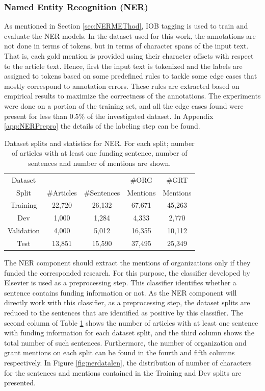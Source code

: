 \documentclass{report}
\theoremstyle{definition}
\theoremstyle{remark}
\begin{document}
\subsubsection{Named Entity Recognition (NER)}
As mentioned in Section \ref{sec:NERMEThod}, IOB tagging is used to train and evaluate the NER models. In the dataset used for this work, the annotations are not done in terms of tokens, but in terms of character spans of the input text. That is, each gold mention is provided using their character offsets with respect to the article text. Hence, first the input text is tokenized and the labels are assigned to tokens based on some predefined rules to tackle some edge cases that mostly correspond to annotation errors. These rules are extracted based on empirical results to maximize the correctness of the annotations. The experiments were done on a portion of the training set, and all the edge cases found were present for less than $0.5\%$ of the investigated dataset. In Appendix \ref{app:NERPrepro} the details of the labeling step can be found.

\begin{table}[h!]
    \centering
    \begin{tabular}{ccccc}
    Dataset &  &  &\#ORG& \#GRT  \\
    Split & \#Articles & \#Sentences &Mentions&Mentions \\
    \hline
    Training   &22,720&26,132& 67,671 &45,263 \\
    Dev &1,000&1,284&4,333&2,770\\
    Validation &4,000&5,012&16,355 & 10,112\\
    Test & 13,851 & 15,590 &37,495&25,349\\
    \end{tabular}
    \caption{Dataset splits and statistics for NER. For each split; number of articles with at least one funding sentence, number of sentences and number of mentions are shown.}
    \label{tab:goldstatsner}
\end{table}

The NER component should extract the mentions of organizations only if they funded the corresponded research. For this purpose, the classifier developed by Elsevier is used as a preprocessing step. This classifier identifies whether a sentence contains funding information or not. As the NER component will directly work with this classifier, as a preprocessing step, the dataset splits are reduced to the sentences that are identified as positive by this classifier. The second column of Table \ref{tab:goldstatsner} shows the number of articles with at least one sentence with funding information for each dataset split, and the third column shows the total number of such sentences. Furthermore, the number of organization and grant mentions on each split can be found in the fourth and fifth columns respectively. In Figure \ref{fig:nerdatalen}, the distribution of number of characters for the sentences and mentions contained in the Training and Dev splits are presented.
\end{document}
